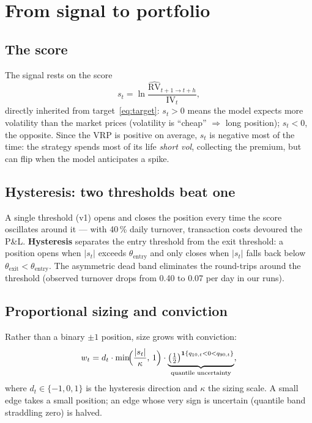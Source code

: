 \documentclass[11pt,a4paper]{article}
\newcommand{\RV}{\mathrm{RV}}
\newcommand{\IV}{\mathrm{IV}}
\begin{document}
\section{From signal to portfolio}
\label{sec:signal}

\subsection{The score}

The signal rests on the score
\begin{equation}
s_t = \ln\frac{\widehat{\RV}_{t+1\to t+h}}{\IV_t},
\end{equation}
directly inherited from target~\eqref{eq:target}: $s_t>0$ means the model
expects more volatility than the market prices (volatility is ``cheap''
$\Rightarrow$ long position); $s_t<0$, the opposite. Since the VRP is
positive on average, $s_t$ is negative most of the time: the strategy spends
most of its life \emph{short vol}, collecting the premium, but can flip when
the model anticipates a spike.

\subsection{Hysteresis: two thresholds beat one}

A single threshold (v1) opens and closes the position every time the score
oscillates around it --- with 40\,\% daily turnover, transaction costs
devoured the P\&L. \textbf{Hysteresis} separates the entry threshold from the
exit threshold: a position opens when $|s_t|$ exceeds
$\theta_{\text{entry}}$ and only closes when $|s_t|$ falls back below
$\theta_{\text{exit}} < \theta_{\text{entry}}$. The asymmetric dead band
eliminates the round-trips around the threshold (observed turnover drops from
0.40 to 0.07 per day in our runs).

\subsection{Proportional sizing and conviction}

Rather than a binary $\pm1$ position, size grows with conviction:
\begin{equation}
w_t = d_t \cdot \min\!\Bigl(\frac{|s_t|}{\kappa},\, 1\Bigr)
\cdot \underbrace{\bigl(\tfrac{1}{2}\bigr)^{\mathbf{1}\{q_{10,t}<0<q_{90,t}\}}}_{\text{quantile uncertainty}},
\end{equation}
where $d_t \in \{-1,0,1\}$ is the hysteresis direction and $\kappa$ the
sizing scale. A small edge takes a small position; an edge whose very sign is
uncertain (quantile band straddling zero) is halved.
\end{document}
